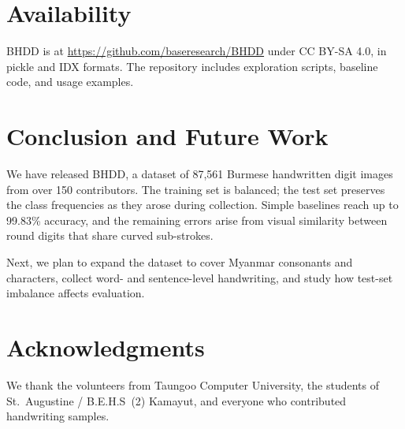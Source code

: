 \documentclass[conference]{IEEEtran}
\begin{document}
\section{Availability}

BHDD is at \url{https://github.com/baseresearch/BHDD} under CC BY-SA 4.0,
in pickle and IDX formats. The repository includes exploration scripts,
baseline code, and usage examples.

\section{Conclusion and Future Work}

We have released BHDD, a dataset of 87,561 Burmese handwritten digit
images from over 150 contributors. The training set is balanced; the
test set preserves the class frequencies as they arose during
collection. Simple baselines reach up to
99.83\% accuracy, and the remaining errors arise from visual similarity between
round digits that share curved sub-strokes.

Next, we plan to expand the dataset to cover Myanmar consonants and
characters, collect word- and sentence-level handwriting, and study how
test-set imbalance affects evaluation.

\section*{Acknowledgments}

We thank the volunteers from Taungoo Computer University, the students
of St.\ Augustine / B.E.H.S~(2) Kamayut, and everyone who contributed
handwriting samples.



\end{document}
